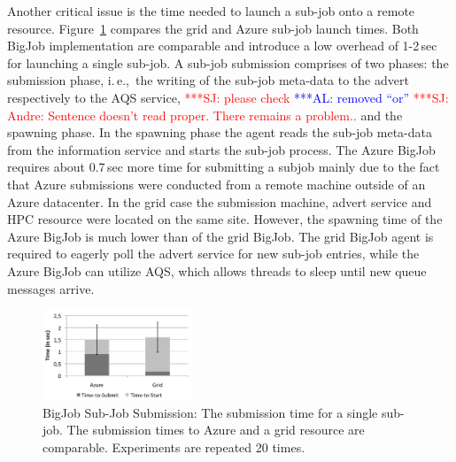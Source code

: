 \documentclass[conference,final]{IEEEtran}
\newcommand{\alnote}[1]{ {\textcolor{blue} { ***AL: #1 }}}
\newcommand{\jhanote}[1]{ {\textcolor{red} { ***SJ: #1 }}}
\newcommand{\alnote}[1]{}
\newcommand{\jhanote}[1]{}
\begin{document}
Another critical issue is the time needed to launch a sub-job onto a
remote resource. Figure~\ref{fig:performance_startup} compares the
grid and Azure sub-job launch times. Both BigJob implementation are
comparable and introduce a low overhead of 1-2\,sec for launching a
single sub-job.
A sub-job submission comprises of two phases: the submission phase,
i.\,e.,\ the writing of the sub-job meta-data to the advert
respectively to the AQS service, \jhanote{please check}
\alnote{removed ``or''} \jhanote{Andre: Sentence doesn't read
  proper. There remains a problem..} and the spawning phase. In the
spawning phase the agent reads the sub-job meta-data from the
information service and starts the sub-job process. The Azure BigJob
requires about 0.7\,sec more time for submitting a subjob mainly due
to the fact that Azure submissions were conducted from a remote
machine outside of an Azure datacenter. In the grid case the
submission machine, advert service and HPC resource were located on
the same site.  However, the spawning time of the Azure BigJob is much
lower than of the grid BigJob. The grid BigJob agent is required to
eagerly poll the advert service for new sub-job entries, while the
Azure BigJob can utilize AQS, which allows threads to sleep until new
queue messages arrive.
\begin{figure}[htbp]
    \centering
        \includegraphics[width=0.4\textwidth]{performance/startup.pdf}
        \caption{BigJob Sub-Job Submission: The submission time for
          a single sub-job. The submission times to Azure and a grid
          resource are comparable. Experiments are repeated 20 times.
          }
    \label{fig:performance_startup}
\end{figure}
\end{document}
